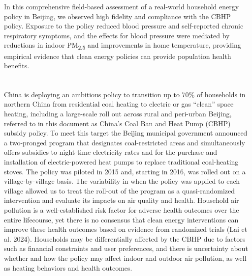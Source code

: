 \documentclass[
  letterpaper,
  DIV=11,
  numbers=noendperiod]{scrartcl}
\providecommand{\DIFadd}[1]{{\protect\color{blue}\uwave{#1}}} %
\providecommand{\DIFaddbegin}{} %
\providecommand{\DIFaddend}{} %
\providecommand{\DIFdelbegin}{} %
\providecommand{\DIFdelend}{} %
\newcommand{\DIFscaledelfig}{0.5}
\newlength{\DIFdelgraphicswidth} %
\newlength{\DIFdelgraphicsheight} %
\newcommand{\DIFaddincludegraphics}[2][]{{\color{blue}\fbox{\DIFOincludegraphics[#1]{#2}}}} %
\newcommand{\DIFdelincludegraphics}[2][]{%
\sbox{\DIFdelgraphicsbox}{\DIFOincludegraphics[#1]{#2}}%
\settoboxwidth{\DIFdelgraphicswidth}{\DIFdelgraphicsbox} %
\settoboxtotalheight{\DIFdelgraphicsheight}{\DIFdelgraphicsbox} %
\scalebox{\DIFscaledelfig}{%
\parbox[b]{\DIFdelgraphicswidth}{\usebox{\DIFdelgraphicsbox}\\[-\baselineskip] \rule{\DIFdelgraphicswidth}{0em}}\llap{\resizebox{\DIFdelgraphicswidth}{\DIFdelgraphicsheight}{%
\setlength{\unitlength}{\DIFdelgraphicswidth}%
\begin{picture}(1,1)%
\thicklines\linethickness{2pt} %
{\color[rgb]{1,0,0}\put(0,0){\framebox(1,1){}}}%
{\color[rgb]{1,0,0}\put(0,0){\line( 1,1){1}}}%
{\color[rgb]{1,0,0}\put(0,1){\line(1,-1){1}}}%
\end{picture}%
}\hspace*{3pt}}} %
} %
\DeclareRobustCommand{\DIFaddbegin}{\DIFOaddbegin \let\includegraphics\DIFaddincludegraphics} %
\DeclareRobustCommand{\DIFaddend}{\DIFOaddend \let\includegraphics\DIFOincludegraphics} %
\DeclareRobustCommand{\DIFdelbegin}{\DIFOdelbegin \let\includegraphics\DIFdelincludegraphics} %
\DeclareRobustCommand{\DIFdelend}{\DIFOaddend \let\includegraphics\DIFOincludegraphics} %
\begin{document}
In this comprehensive field-based assessment of a real-world household
energy policy in Beijing, we observed high fidelity and compliance with
the CBHP policy. Exposure to the policy reduced blood pressure and
self-reported chronic respiratory symptoms, and the effects for blood
pressure were mediated by reductions in indoor PM\textsubscript{2.5} and
improvements in home temperature, providing empirical evidence that
clean energy policies can provide population health benefits.

\newpage

\DIFdelbegin %
\DIFdelend \DIFaddbegin \section{\DIFadd{Introduction}}\label{introduction-1}
\DIFaddend 

China is deploying an ambitious policy to transition up to 70\% of
households in northern China from residential coal heating to electric
or gas ``clean'' space heating, including a large-scale roll out across
rural and peri-urban Beijing, referred to in this document as China's
Coal Ban and Heat Pump (CBHP) subsidy policy. To meet this target the
Beijing municipal government announced a two-pronged program that
designates coal-restricted areas and simultaneously offers subsidies to
night-time electricity rates and for the purchase and installation of
electric-powered heat pumps to replace traditional coal-heating stoves.
The policy was piloted in 2015 and, starting in 2016, was rolled out on
a village-by-village basis. The variability in when the policy was
applied to each village allowed us to treat the roll-out of the program
as a quasi-randomized intervention and evaluate its impacts on air
quality and health. Household air pollution is a well-established risk
factor for adverse health outcomes over the entire lifecourse, yet there
is no consensus that clean energy interventions can improve these health
outcomes based on evidence from randomized trials (Lai et al. 2024).
Households may be differentially affected by the CBHP due to factors
such as financial constraints and user preferences, and there is
uncertainty about whether and how the policy may affect indoor and
outdoor air pollution, as well as heating behaviors and health outcomes.
\end{document}
